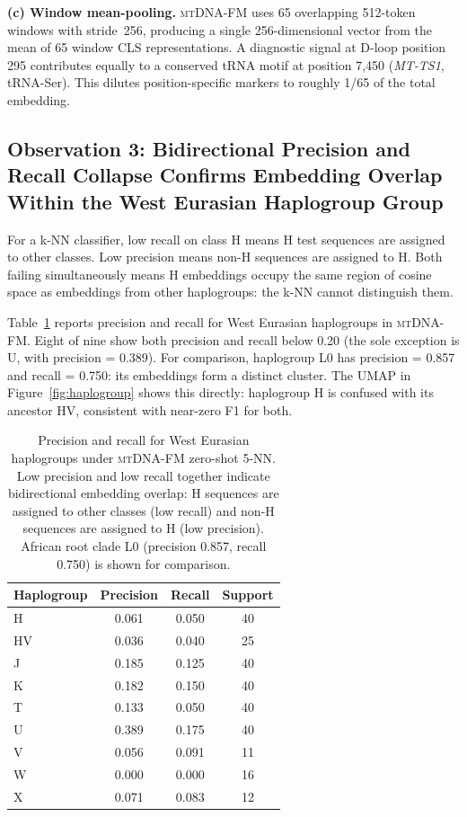 \documentclass[10pt]{article}
\newcommand{\mtdnafm}{\textsc{mtDNA-FM}\xspace}
\begin{document}
\noindent\textbf{(c) Window mean-pooling.} \mtdnafm{} uses 65 overlapping 512-token windows
with stride~256, producing a single 256-dimensional vector from the mean of 65 window CLS
representations. A diagnostic signal at D-loop position 295 contributes equally to a conserved
tRNA motif at position 7,450 (\emph{MT-TS1}, tRNA-Ser). This dilutes position-specific markers to
roughly 1/65 of the total embedding.

\subsection{Observation 3: Bidirectional Precision and Recall Collapse Confirms Embedding
Overlap Within the West Eurasian Haplogroup Group}
\label{sec:precision_recall}

For a k-NN classifier, low recall on class H means H test sequences are assigned to other
classes. Low precision means non-H sequences are assigned to H. Both failing simultaneously
means H embeddings occupy the same region of cosine space as embeddings from other haplogroups:
the k-NN cannot distinguish them.

Table~\ref{tab:precision_recall} reports precision and recall for West Eurasian haplogroups in
\mtdnafm{}. Eight of nine show both precision and recall below 0.20 (the sole exception is
U, with precision = 0.389). For comparison, haplogroup L0 has precision = 0.857 and recall = 0.750:
its embeddings form a distinct cluster. The UMAP
in Figure~\ref{fig:haplogroup} shows this directly: haplogroup H is confused with its ancestor
HV, consistent with near-zero F1 for both.

\begin{table}[h]
\centering
\caption{Precision and recall for West Eurasian haplogroups under \mtdnafm{} zero-shot 5-NN.
Low precision and low recall together indicate bidirectional embedding overlap: H sequences
are assigned to other classes (low recall) and non-H sequences are assigned to H (low precision).
African root clade L0 (precision 0.857, recall 0.750) is shown for comparison.}
\label{tab:precision_recall}
\begin{tabular}{lccc}
\toprule
\textbf{Haplogroup} & \textbf{Precision} & \textbf{Recall} & \textbf{Support} \\
\midrule
H  & 0.061 & 0.050 & 40 \\
HV & 0.036 & 0.040 & 25 \\
J  & 0.185 & 0.125 & 40 \\
K  & 0.182 & 0.150 & 40 \\
T  & 0.133 & 0.050 & 40 \\
U  & 0.389 & 0.175 & 40 \\
V  & 0.056 & 0.091 & 11 \\
W  & 0.000 & 0.000 & 16 \\
X  & 0.071 & 0.083 & 12 \\
\bottomrule
\end{tabular}
\end{table}
\end{document}
